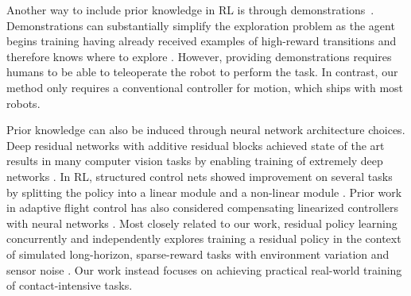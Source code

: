Another way to include prior knowledge in RL is through demonstrations~\cite{peters2008baseball, kober2008mp, rajeswaran2018dextrous, hester17dqfd, vecerik17ddpgfd, nair2018demonstrations}. Demonstrations can substantially simplify the exploration problem as the agent begins training having already received examples of high-reward transitions and therefore knows where to explore \cite{subramanian2016efd}. However, providing demonstrations requires humans to be able to teleoperate the robot to perform the task. In contrast, our method only requires a conventional controller for motion, which ships with most robots.

Prior knowledge can also be induced through neural network architecture choices. Deep residual networks with additive residual blocks achieved state of the art results in many computer vision tasks by enabling training of extremely deep networks \cite{he2016resnet}. In RL, structured control nets showed improvement on several tasks by splitting the policy into a linear module and a non-linear module \cite{srouji18structuredcontrolnets}. Prior work in adaptive flight control has also considered compensating linearized controllers with neural networks \cite{johnson2000hedging}. Most closely related to our work, residual policy learning concurrently and independently explores training a residual policy in the context of simulated long-horizon, sparse-reward tasks with environment variation and sensor noise \cite{silver18residualpolicylearning}. Our work instead focuses on achieving practical real-world training of contact-intensive tasks.
